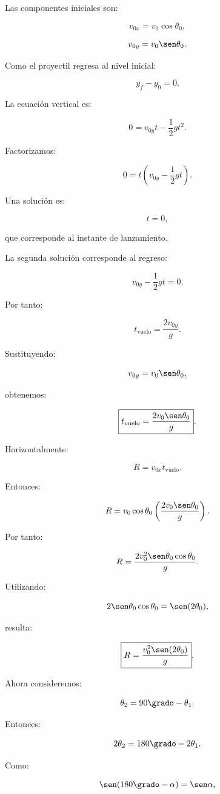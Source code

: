 \begin{explicacion}
Las componentes iniciales son:

\[
v_{0x}
=
v_0\cos\theta_0,
\]

\[
v_{0y}
=
v_0\sen\theta_0.
\]

Como el proyectil regresa al nivel inicial:

\[
y_f-y_0=0.
\]

La ecuación vertical es:

\[
0
=
v_{0y}t
-
\frac{1}{2}gt^2.
\]

Factorizamos:

\[
0
=
t
\left(
v_{0y}
-
\frac{1}{2}gt
\right).
\]

Una solución es:

\[
t=0,
\]

que corresponde al instante de lanzamiento.

La segunda solución corresponde al regreso:

\[
v_{0y}
-
\frac{1}{2}gt
=
0.
\]

Por tanto:

\[
t_{\mathrm{vuelo}}
=
\frac{
2v_{0y}
}{
g
}.
\]

Sustituyendo:

\[
v_{0y}
=
v_0\sen\theta_0,
\]

obtenemos:

\[
\boxed{
t_{\mathrm{vuelo}}
=
\frac{
2v_0\sen\theta_0
}{
g
}
}.
\]

Horizontalmente:

\[
R
=
v_{0x}t_{\mathrm{vuelo}}.
\]

Entonces:

\[
R
=
v_0\cos\theta_0
\left(
\frac{
2v_0\sen\theta_0
}{
g
}
\right).
\]

Por tanto:

\[
R
=
\frac{
2v_0^2
\sen\theta_0
\cos\theta_0
}{
g
}.
\]

Utilizando:

\[
2\sen\theta_0\cos\theta_0
=
\sen(2\theta_0),
\]

resulta:

\[
\boxed{
R
=
\frac{
v_0^2\sen(2\theta_0)
}{
g
}
}.
\]

Ahora consideremos:

\[
\theta_2
=
90\grado-\theta_1.
\]

Entonces:

\[
2\theta_2
=
180\grado-2\theta_1.
\]

Como:

\[
\sen(180\grado-\alpha)
=
\sen\alpha,
\]


\end{explicacion}
